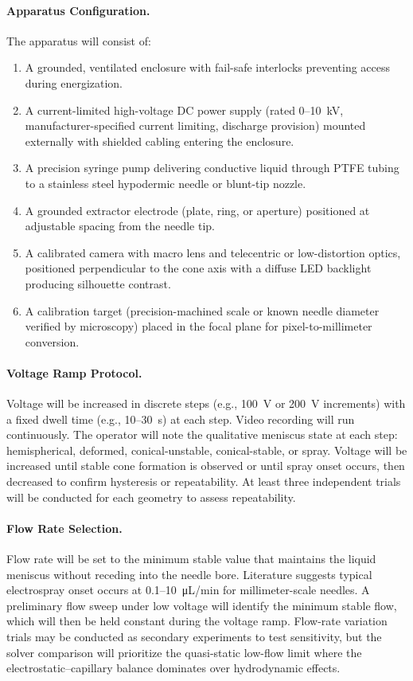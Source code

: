 \paragraph{Apparatus Configuration.} The apparatus will consist of:
\begin{enumerate}
    \item A grounded, ventilated enclosure with fail-safe interlocks preventing access during energization.
    \item A current-limited high-voltage DC power supply (rated 0--10~kV, manufacturer-specified current limiting, discharge provision) mounted externally with shielded cabling entering the enclosure.
    \item A precision syringe pump delivering conductive liquid through PTFE tubing to a stainless steel hypodermic needle or blunt-tip nozzle.
    \item A grounded extractor electrode (plate, ring, or aperture) positioned at adjustable spacing from the needle tip.
    \item A calibrated camera with macro lens and telecentric or low-distortion optics, positioned perpendicular to the cone axis with a diffuse LED backlight producing silhouette contrast.
    \item A calibration target (precision-machined scale or known needle diameter verified by microscopy) placed in the focal plane for pixel-to-millimeter conversion.
\end{enumerate}

\paragraph{Voltage Ramp Protocol.} Voltage will be increased in discrete steps (e.g., \SI{100}{V} or \SI{200}{V} increments) with a fixed dwell time (e.g., 10--30~s) at each step. Video recording will run continuously. The operator will note the qualitative meniscus state at each step: hemispherical, deformed, conical-unstable, conical-stable, or spray. Voltage will be increased until stable cone formation is observed or until spray onset occurs, then decreased to confirm hysteresis or repeatability. At least three independent trials will be conducted for each geometry to assess repeatability.

\paragraph{Flow Rate Selection.} Flow rate will be set to the minimum stable value that maintains the liquid meniscus without receding into the needle bore. Literature suggests typical electrospray onset occurs at 0.1--10~\si{\micro\liter/\minute} for millimeter-scale needles. A preliminary flow sweep under low voltage will identify the minimum stable flow, which will then be held constant during the voltage ramp. Flow-rate variation trials may be conducted as secondary experiments to test sensitivity, but the solver comparison will prioritize the quasi-static low-flow limit where the electrostatic--capillary balance dominates over hydrodynamic effects.


